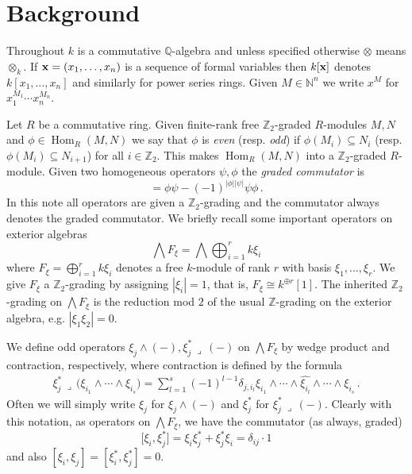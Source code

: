 \documentclass[english,letter paper,12pt,leqno]{article}
\theoremstyle{example}
\numberwithin{equation}{section}
\def\Hom{\operatorname{Hom}}
\def\be{\begin{equation}}
\def\ee{\end{equation}}
\def\nZ{\mathds{Z}}
\begin{document}
\section{Background}

Throughout $k$ is a commutative $\mathbb{Q}$-algebra and unless specified otherwise $\otimes$ means $\otimes_k$. If $\bold{x} = (x_1,\ldots,x_n)$ is a sequence of formal variables then $k[\bold{x}]$ denotes $k[x_1,\ldots,x_n]$ and similarly for power series rings. Given $M \in \mathbb{N}^n$ we write $x^M$ for $x_1^{M_1} \cdots x_n^{M_n}$. 

Let $R$ be a commutative ring. Given finite-rank free $\nZ_2$-graded $R$-modules $M, N$ and $\phi \in \Hom_R(M,N)$ we say that $\phi$ is \emph{even} (resp. \emph{odd}) if $\phi(M_i) \subseteq N_i$ (resp. $\phi(M_i) \subseteq N_{i+1}$) for all $i \in \nZ_2$. This makes $\Hom_R(M,N)$ into a $\nZ_2$-graded $R$-module. Given two homogeneous operators $\psi, \phi$ the \emph{graded commutator} is
\be
[\phi, \psi] = \phi \psi - (-1)^{|\phi||\psi|} \psi \phi\,.
\ee
In this note all operators are given a $\nZ_2$-grading and the commutator always denotes the graded commutator. We briefly recall some important operators on exterior algebras
\[
\bigwedge F_\xi = \bigwedge \bigoplus_{i=1}^r k \xi_i
\]
where $F_\xi = \bigoplus_{i=1}^r k \xi_i$ denotes a free $k$-module of rank $r$ with basis $\xi_1,\ldots,\xi_r$. We give $F_\xi$ a $\nZ_2$-grading by assigning $|\xi_i| = 1$, that is, $F_\xi \cong k^{\oplus r}[1]$. The inherited $\nZ_2$-grading on $\bigwedge F_\xi$ is the reduction mod $2$ of the usual $\nZ$-grading on the exterior algebra, e.g. $|\xi_1 \xi_2| = 0$.

We define odd operators $\xi_j \wedge (-), \xi_j^* \,\lrcorner\, (-)$ on $\bigwedge F_\xi$ by wedge product and contraction, respectively, where contraction is defined by the formula
\begin{align*}
\xi_j^* \,\lrcorner\, \Big( \xi_{i_1} \wedge \cdots \wedge \xi_{i_s} \Big) = \sum_{l=1}^s (-1)^{l-1} \delta_{j, i_l} \xi_{i_1} \wedge \cdots \wedge \widehat{ \xi_{i_l} } \wedge \cdots \wedge \xi_{i_s}\,.
\end{align*}
Often we will simply write $\xi_j$ for $\xi_j \wedge (-)$ and $\xi_j^*$ for $\xi_j^* \,\lrcorner\, (-)$. Clearly with this notation, as operators on $\bigwedge F_\xi$, we have the commutator (as always, graded)
\be\label{eq:wedge_contract_comm}
\big[ \xi_i, \xi_j^* \big] = \xi_i \xi_j^* + \xi_j^* \xi_i = \delta_{ij} \cdot 1
\ee
and also $[ \xi_i, \xi_j ] = [\xi_i^*, \xi_j^*] = 0$.
\end{document}
